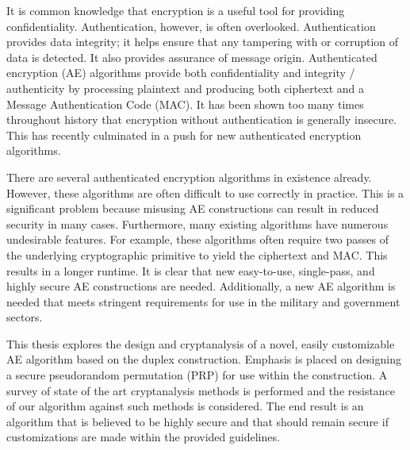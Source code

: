 It is common knowledge that encryption is a useful tool for providing confidentiality.
Authentication, however, is often overlooked.
Authentication provides data integrity; it helps ensure that any tampering with or corruption of data is detected.
It also provides assurance of message origin.
Authenticated encryption (AE) algorithms provide both confidentiality and integrity / authenticity by processing plaintext and producing both ciphertext and a Message Authentication Code (MAC).
It has been shown too many times throughout history that encryption without authentication is generally insecure.
This has recently culminated in a push for new authenticated encryption algorithms.

There are several authenticated encryption algorithms in existence already.
However, these algorithms are often difficult to use correctly in practice.
This is a significant problem because misusing AE constructions can result in reduced security in many cases.
Furthermore, many existing algorithms have numerous undesirable features.
For example, these algorithms often require two passes of the underlying cryptographic primitive to yield the ciphertext and MAC.
This results in a longer runtime.
It is clear that new easy-to-use, single-pass, and highly secure AE constructions are needed.
Additionally, a new AE algorithm is needed that meets stringent requirements for use in the military and government sectors.

This thesis explores the design and cryptanalysis of a novel, easily customizable AE algorithm based on the duplex construction.
Emphasis is placed on designing a secure pseudorandom permutation (PRP) for use within the construction.
A survey of state of the art cryptanalysis methods is performed and the resistance of our algorithm against such methods is considered.
The end result is an algorithm that is believed to be highly secure and that should remain secure if customizations are made within the provided guidelines.

